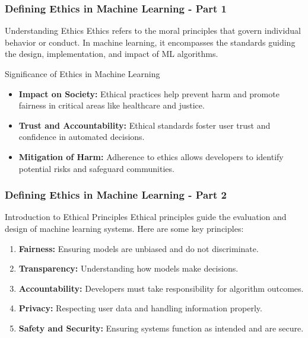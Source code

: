\documentclass[aspectratio=169]{beamer}
\begin{document}
\begin{frame}[fragile]
    \frametitle{Defining Ethics in Machine Learning - Part 1}
    \begin{block}{Understanding Ethics}
        Ethics refers to the moral principles that govern individual behavior or conduct. In machine learning, it encompasses the standards guiding the design, implementation, and impact of ML algorithms.
    \end{block}
    
    \begin{block}{Significance of Ethics in Machine Learning}
        \begin{itemize}
            \item \textbf{Impact on Society:} Ethical practices help prevent harm and promote fairness in critical areas like healthcare and justice.
            \item \textbf{Trust and Accountability:} Ethical standards foster user trust and confidence in automated decisions.
            \item \textbf{Mitigation of Harm:} Adherence to ethics allows developers to identify potential risks and safeguard communities.
        \end{itemize}
    \end{block}
\end{frame}

\begin{frame}[fragile]
    \frametitle{Defining Ethics in Machine Learning - Part 2}
    \begin{block}{Introduction to Ethical Principles}
        Ethical principles guide the evaluation and design of machine learning systems. Here are some key principles:
    \end{block}
    
    \begin{enumerate}
        \item \textbf{Fairness:} Ensuring models are unbiased and do not discriminate.
        \item \textbf{Transparency:} Understanding how models make decisions.
        \item \textbf{Accountability:} Developers must take responsibility for algorithm outcomes.
        \item \textbf{Privacy:} Respecting user data and handling information properly.
        \item \textbf{Safety and Security:} Ensuring systems function as intended and are secure.
    \end{enumerate}
\end{frame}
\end{document}
